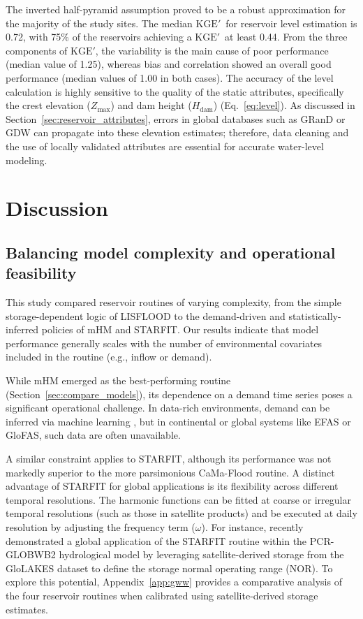 \documentclass[hess, manuscript]{copernicus}
\newcommand{\KGEmod}{$\text{KGE}'$}
\begin{document}
The inverted half-pyramid assumption proved to be a robust approximation for the majority of the study sites. The median \KGEmod\ for reservoir level estimation is 0.72, with 75\% of the reservoirs achieving a \KGEmod\ at least 0.44. From the three components of \KGEmod, the variability is the main cause of poor performance (median value of 1.25), whereas bias and correlation showed an overall good performance (median values of 1.00 in both cases). The accuracy of the level calculation is highly sensitive to the quality of the static attributes, specifically the crest elevation ($Z_{\max}$) and dam height ($H_{\text{dam}}$) (Eq.~\ref{eq:level}). As discussed in Section~\ref{sec:reservoir_attributes}, errors in global databases such as GRanD or GDW can propagate into these elevation estimates; therefore, data cleaning and the use of locally validated attributes are essential for accurate water-level modeling.



\section{Discussion}
\label{sec:discussion}

\subsection{Balancing model complexity and operational feasibility}
\label{sec:comparison_reservoirs}

This study compared reservoir routines of varying complexity, from the simple storage-dependent logic of LISFLOOD to the demand-driven and statistically-inferred policies of mHM and STARFIT. Our results indicate that model performance generally scales with the number of environmental covariates included in the routine (e.g., inflow or demand).

While mHM emerged as the best-performing routine (Section~\ref{sec:compare_models}), its dependence on a demand time series poses a significant operational challenge. In data-rich environments, demand can be inferred via machine learning \citep{Shrestha2024}, but in continental or global systems like EFAS or GloFAS, such data are often unavailable. 

A similar constraint applies to STARFIT, although its performance was not markedly superior to the more parsimonious CaMa-Flood routine. A distinct advantage of STARFIT for global applications is its flexibility across different temporal resolutions. The harmonic functions can be fitted at coarse or irregular temporal resolutions (such as those in satellite products) and be executed at daily resolution by adjusting the frequency term ($\omega$). For instance, \citet{Steyaert2025} recently demonstrated a global application of the STARFIT routine within the PCR-GLOBWB2 hydrological model by leveraging satellite-derived storage from the GloLAKES dataset \citep{Hou2024} to define the storage normal operating range (NOR). To explore this potential, Appendix~\ref{app:gww} provides a comparative analysis of the four reservoir routines when calibrated using satellite-derived storage estimates.
\end{document}
